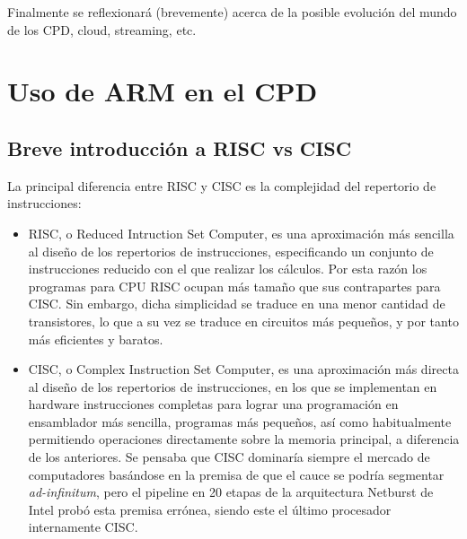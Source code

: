 \documentclass[a4paper,openright,12pt]{article}
\begin{document}
Finalmente se reflexionará (brevemente) acerca de la posible evolución del mundo de los CPD, cloud, streaming, etc.

\newpage
\section{Uso de ARM en el CPD}\label{section:uso_arm_cpd}
\subsection{Breve introducción a RISC vs CISC}\label{subsection:introduccion_risc_cisc}
La principal diferencia entre RISC y \gls{CISC} es la complejidad del repertorio de instrucciones:
\begin{itemize}
    \item RISC, o Reduced Intruction Set Computer, es una aproximación más sencilla al diseño de los repertorios de instrucciones, especificando un conjunto de instrucciones reducido con el que
    realizar los cálculos. Por esta razón los programas para CPU RISC ocupan más tamaño que sus contrapartes para CISC. Sin embargo, dicha simplicidad se traduce en una menor cantidad de
    transistores, lo que a su vez se traduce en circuitos más pequeños, y por tanto más eficientes y baratos. \autocite[5]{measuring_moores_law_NBERc13897}
    \item CISC, o Complex Instruction Set Computer, es una aproximación más directa al diseño de los repertorios de instrucciones, en los que se implementan en hardware instrucciones
    completas para lograr una programación en ensamblador más sencilla, programas más pequeños, así como habitualmente permitiendo operaciones directamente sobre la memoria principal, a 
    diferencia de los anteriores. Se pensaba que CISC dominaría siempre el mercado de computadores basándose en la premisa de que el cauce se podría segmentar \emph{ad-infinitum}, pero el 
    pipeline en 20 etapas de la arquitectura Netburst de Intel probó esta premisa errónea, siendo este el último procesador internamente CISC. \autocite[10]{inside_netburst_architecture_carmean2000inside}
\end{itemize}
\end{document}
